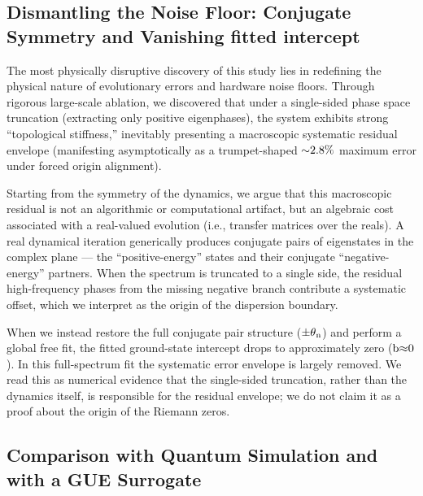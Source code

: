 \documentclass[fleqn,10pt]{wlscirep}
\begin{document}
\subsection*{Dismantling the Noise Floor: Conjugate Symmetry and Vanishing fitted intercept}

The most physically disruptive discovery of this study lies in
redefining the physical nature of evolutionary errors and hardware noise
floors. Through rigorous large-scale ablation, we discovered that under
a single-sided phase space truncation (extracting only positive
eigenphases), the system exhibits strong ``topological stiffness,''
inevitably presenting a macroscopic systematic residual envelope
(manifesting asymptotically as a trumpet-shaped \(\text{\ensuremath{\sim}2.8\%}\)
maximum error under forced origin alignment).

Starting from the symmetry of the dynamics, we argue that
this macroscopic residual is not an algorithmic or computational
artifact, but an algebraic cost associated with a real-valued
evolution (i.e., transfer matrices over the reals). A real
dynamical iteration generically produces conjugate pairs of
eigenstates in the complex plane --- the ``positive-energy'' states and
their conjugate ``negative-energy'' partners. When the spectrum is
truncated to a single side, the residual high-frequency phases from the
missing negative branch contribute a systematic offset, which we
interpret as the origin of the dispersion boundary.

When we instead restore the full conjugate pair structure
(\(\text{\ensuremath{\pm}}\text{\ensuremath{\theta}}_{\text{n}}\)) and perform a global free fit, the
fitted ground-state intercept drops to approximately zero
(\(\text{b}\text{\ensuremath{\approx}0}\)). In this full-spectrum fit the systematic error
envelope is largely removed. We read this as numerical evidence that the
single-sided truncation, rather than the dynamics itself, is responsible
for the residual envelope; we do not claim it as a proof about the origin
of the Riemann zeros.

\subsection*{Comparison with Quantum Simulation and with a GUE Surrogate}
\end{document}
